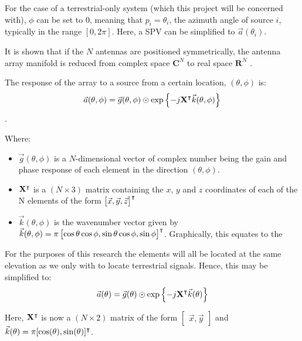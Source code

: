 For the case of a terrestrial-only system (which this project will be concerned with), \(\phi\) can be set to 0, meaning that \(p_i = \theta_i\), the azimuth angle of source \(i\), typically in the range \([0, 2\pi]\). Here, a SPV can be simplified to \(\vec{a}(\theta_i)\).

It is shown that if the \(N\) antennas are positioned symmetrically, the antenna array manifold is reduced from complex space \(\mathbf{C}^N\) to real space \(\mathbf{R}^N\) \cite{dacos1995estimating}.

The response of the array to a source from a certain location, \((\theta, \phi)\) is:
\begin{equation}
\vec{a}(\theta, \phi) = \vec{g}(\theta, \phi) \odot \exp \left\{ -j \mathbf{X}^\intercal \vec{k}(\theta,\phi) \right\}
\end{equation}
\cite{dacos1995estimating}.

Where:
\begin{itemize}
  \item \(\vec{g}(\theta, \phi)\) is a \(N\)-dimensional vector of complex number being the gain and phase response  of each element in the direction \((\theta, \phi)\). 
\item \(\mathbf{X}^\intercal\) is a \((N \times 3)\) matrix containing the \(x\), \(y\) and \(z\) coordinates of each of the N elements of the form \(\begin{bmatrix} \vec{x}, \vec{y}, \vec{z} \end{bmatrix}^\intercal\)
\item \(\vec{k}(\theta, \phi)\) is the wavenumber vector given by \(\vec{k}(\theta, \phi) = \pi \begin{bmatrix} \cos\theta\cos\phi, \sin\theta\cos\phi, \sin\phi \end{bmatrix}^\intercal \). Graphically, this equates to the 
\end{itemize}

For the purposes of this research the elements will all be located at the same elevation as we only with to locate terrestrial signals. Hence, this may be simplified to:
\begin{equation}
  \vec{a}(\theta) = \vec{g}(\theta) \odot \exp \left\{ -j \mathbf{X}^\intercal \vec{k}(\theta) \right\}
\end{equation}
    
Here, \(\mathbf{X}^\intercal\) is now a \((N \times 2)\) matrix of the form \(\begin{bmatrix} \vec{x}, \vec{y} \end{bmatrix}\) and \(\vec{k}(\theta) = \pi[\cos(\theta), \sin(\theta)]^\intercal\).

